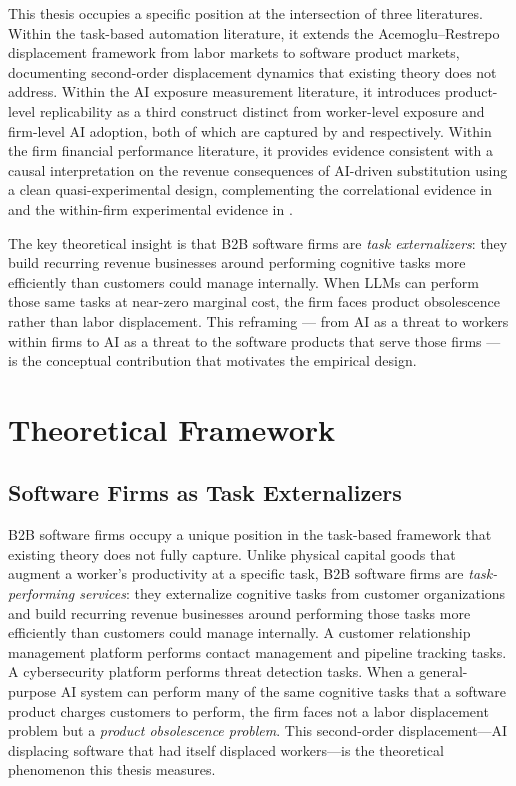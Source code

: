 \documentclass[12pt,a4paper]{article}
\begin{document}
This thesis occupies a specific position at the intersection of three literatures. Within the task-based automation literature, it extends the Acemoglu--Restrepo displacement framework from labor markets to software product markets, documenting second-order displacement dynamics that existing theory does not address. Within the AI exposure measurement literature, it introduces product-level replicability as a third construct distinct from worker-level exposure and firm-level AI adoption, both of which are captured by \citet{labaschin2025} and \citet{babina2024} respectively. Within the firm financial performance literature, it provides evidence consistent with a causal interpretation on the revenue consequences of AI-driven substitution using a clean quasi-experimental design, complementing the correlational evidence in \citet{babina2024} and the within-firm experimental evidence in \citet{brynjolfsson2023}.

The key theoretical insight is that B2B software firms are \emph{task externalizers}: they build recurring revenue businesses around performing cognitive tasks more efficiently than customers could manage internally. When LLMs can perform those same tasks at near-zero marginal cost, the firm faces product obsolescence rather than labor displacement. This reframing --- from AI as a threat to workers within firms to AI as a threat to the software products that serve those firms --- is the conceptual contribution that motivates the empirical design.

\section{Theoretical Framework}
\label{sec:theory}

\subsection{Software Firms as Task Externalizers}

B2B software firms occupy a unique position in the task-based framework that existing theory does not fully capture. Unlike physical capital goods that augment a worker's productivity at a specific task, B2B software firms are \emph{task-performing services}: they externalize cognitive tasks from customer organizations and build recurring revenue businesses around performing those tasks more efficiently than customers could manage internally. A customer relationship management platform performs contact management and pipeline tracking tasks. A cybersecurity platform performs threat detection tasks. When a general-purpose AI system can perform many of the same cognitive tasks that a software product charges customers to perform, the firm faces not a labor displacement problem but a \emph{product obsolescence problem}. This second-order displacement---AI displacing software that had itself displaced workers---is the theoretical phenomenon this thesis measures.
\end{document}
